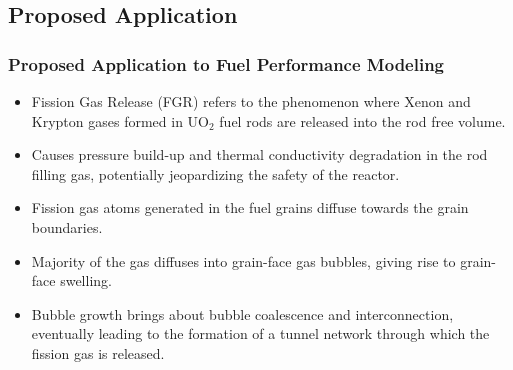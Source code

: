 \subsection{Proposed Application}
\begin{frame}
\frametitle{Proposed Application to Fuel Performance Modeling}

\begin{itemize}
  \item Fission Gas Release (FGR) refers to the phenomenon where Xenon and Krypton gases formed in UO$_2$ fuel rods are released into the rod free volume.
  \item Causes pressure build-up and thermal conductivity degradation in the rod filling gas, potentially jeopardizing the safety of the reactor.
  \item Fission gas atoms generated in the fuel grains diffuse towards the grain boundaries. 
  \item Majority of the gas diffuses into grain-face gas bubbles, giving rise to grain-face swelling.
  \item Bubble growth brings about bubble coalescence and interconnection, eventually leading to the formation of a tunnel network through which the fission gas is released.       
\end{itemize}

\end{frame}   
